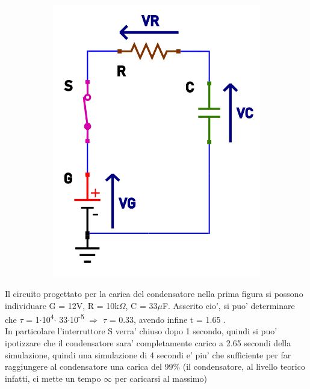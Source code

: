 \documentclass[12pt]{article}
\begin{document}
\begin{figure}[h!]
\begin{subfigure}[b]{0.347\linewidth}
    \includegraphics[width=\linewidth]{data/carica-tensioni.png}
  \end{subfigure}
\end{figure}

Il circuito progettato per la carica del condensatore nella prima figura si possono individuare G = 12V, R = 10k$\Omega$, C = 33$\mu$F. Asserito cio', si puo' determinare che 
$\tau$ = 1$\cdot$10\textsuperscript{4}$\cdot$ 33$\cdot$10\textsuperscript{-5} $\Rightarrow$ $\tau$ = 0.33, avendo infine t = 1.65 . \\
In particolare l'interruttore S verra' chiuso dopo 1 secondo, quindi si puo' ipotizzare che il condensatore sara' completamente carico a 2.65 secondi della simulazione, quindi una simulazione di 4 secondi e' piu' che sufficiente per far raggiungere al condensatore una carica del 99\% (il condensatore, al livello teorico infatti, ci mette un tempo $\infty$ per caricarsi al massimo)
\end{document}
